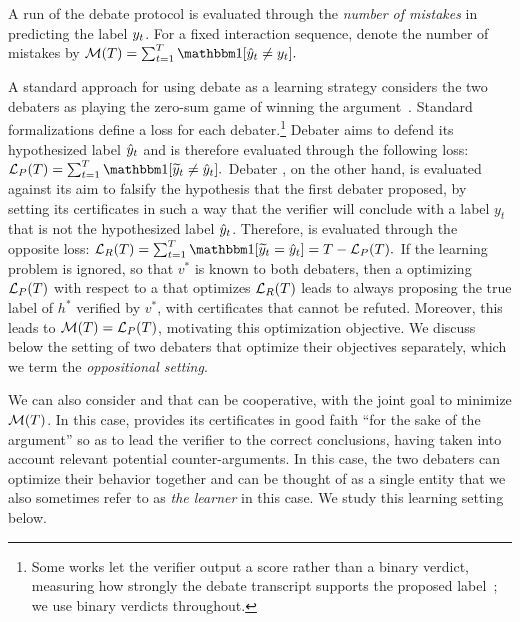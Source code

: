 \documentclass[anon]{alt2027} %
\begin{document}
A run of the debate protocol is evaluated through the \emph{number of mistakes} in predicting the label $y_t$. For a fixed interaction sequence, denote the number of mistakes by
$\Mi(T) = \sum_{t = 1}^T \indct[\hy_t \neq \ty_t].$





A standard approach for using debate as a learning strategy considers the two debaters as playing the zero-sum game of winning the argument~\citep{irving2018debate,chen2023playing,browncohen2024debate,browncohen2025prover}.
Standard formalizations \citep{irving2018debate,browncohen2024debate} define a loss for each debater.\footnote{Some works let the verifier output a score rather than a binary verdict, measuring how strongly the debate transcript supports the proposed label~\citep{chen2023playing,arnesen2024training,browncohen2025prover}; we use binary verdicts throughout.} Debater \dt aims to defend its hypothesized label ${\hat{y}}_t$ and is therefore evaluated through the following loss: $\tLo(T) = \sum_{t = 1}^T \indct[\vy_t \neq \hy_t].$ 
Debater \df, on the other hand, is evaluated against its aim to falsify the hypothesis that the first debater proposed, by setting its certificates in such a way that the verifier will conclude with a label $y_t$ that is not the hypothesized label ${\hat{y}}_t$. 
Therefore, \df is evaluated through the opposite loss: 
 $\fLo(T) = \sum_{t = 1}^T \indct[\vy_t = \hy_t] = T - \tLo(T).$
If the learning problem is ignored, so that $v^*$ is known to both debaters, then a \dt optimizing ${{\mathcal L}_P}(T)$ with respect to a \df that optimizes ${{\mathcal L}_R}(T)$ leads to \dt always proposing the true label of $h^*$ verified by $v^*$, with certificates that cannot be refuted. Moreover, this leads to ${\mathcal M}(T) = {{\mathcal L}_P}(T)$, motivating this optimization objective. We discuss below the setting of two debaters that optimize their objectives separately, which we term the \emph{oppositional setting}. 

We can also consider \dt and \df that can be cooperative, with the joint goal to minimize ${\mathcal M}(T)$. 
In this case, \df provides its certificates in good faith ``for the sake of the argument'' so as to lead the verifier to the correct conclusions, having taken into account relevant potential counter-arguments. In this case, the two debaters can optimize their behavior together and can be thought of as a single entity that we also sometimes refer to as \emph{the learner} in this case. We study this learning setting below.
\end{document}
